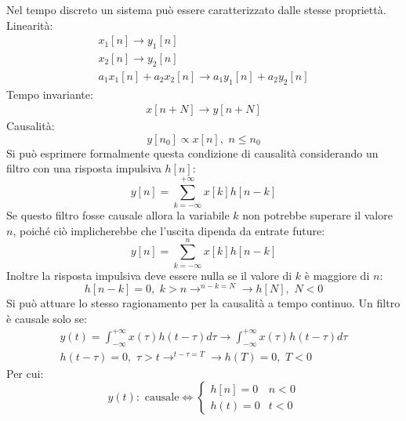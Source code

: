\documentclass{article}
\numberwithin{equation}{subsection}
\begin{document}
Nel tempo discreto un sistema può essere caratterizzato dalle stesse propriettà. 
Linearità:
\begin{gather*}
    x_1[n]\to y_1[n]\\
    x_2[n]\to y_2[n]\\
    a_1x_1[n]+a_2x_2[n]\to a_1y_1[n]+a_2y_2[n]
\end{gather*}
Tempo invariante:
\begin{gather*}
    x[n+N]\to y[n+N]
\end{gather*}
Causalità:
\begin{equation*}
    y[n_0]\propto x[n],\,\, n\leq n_0
\end{equation*}
Si può esprimere formalmente questa condizione di causalità considerando un filtro con una risposta impulsiva $h[n]$:
\begin{equation*}
    y[n]=\displaystyle\sum_{k=-\infty}^{+\infty}x[k]h[n-k]
\end{equation*} 
Se questo filtro fosse causale allora la variabile $k$ non potrebbe superare il valore $n$, poiché ciò implicherebbe che l'uscita dipenda da entrate future:
\begin{equation*}
    y[n]=\displaystyle\sum_{k=-\infty}^nx[k]h[n-k]
\end{equation*}
Inoltre la risposta impulsiva deve essere nulla se il valore di $k$ è maggiore di $n$:
\begin{equation*}
    h[n-k]=0,\,\, k>n\to^{n-k=N}\to h[N],\,\, N<0
\end{equation*} 
Si può attuare lo stesso ragionamento per la causalità a tempo continuo. Un filtro è causale solo se:
\begin{gather*}
    y(t)=\displaystyle\int_{-\infty}^{+\infty}x(\tau)h(t-\tau)d\tau\to \int_{-\infty}^{+\infty}x(\tau)h(t-\tau)d\tau\\
    h(t-\tau)=0,\,\, \tau>t\to^{t-\tau=T}\to h(T)=0,\,\, T<0
\end{gather*}
Per cui:
\begin{equation*}
    y(t):\mbox{ causale}\iff \begin{cases}
        h[n]=0& n<0\\
        h(t)=0& t<0
    \end{cases}
\end{equation*}
\end{document}
